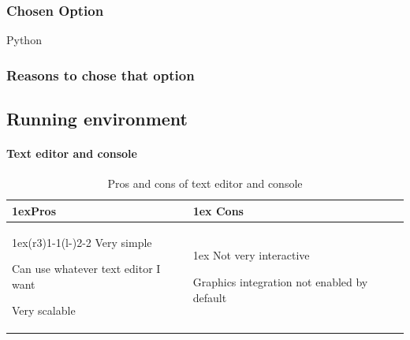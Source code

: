 \documentclass{article}
\begin{document}
        \subsubsection{Chosen Option}
        Python
        \subsubsection{Reasons to chose that option}
    \subsection{Running environment}
    \paragraph{Text editor and console}
    \begin{table}[h]
    \begin{tabularx}{\linewidth}{>{\parskip1ex}X@{\kern4\tabcolsep}>{\parskip1ex}X}
    \toprule
    \hfil\bfseries Pros
    &
    \hfil\bfseries Cons
    \\\cmidrule(r{3\tabcolsep}){1-1}\cmidrule(l{-\tabcolsep}){2-2}
    Very simple\par
    Can use whatever text editor I want\par
    Very scalable\par
    &
    Not very interactive\par
    Graphics integration not enabled by default\par
    \\\bottomrule
    \end{tabularx}
    \caption{Pros and cons of text editor and console}
    \end{table}
\end{document}
